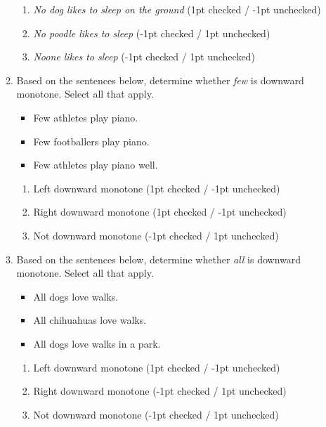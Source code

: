 \documentclass[a4,11pt]{article}
\begin{document}
\begin{enumerate}[leftmargin = 12pt]
\begin{enumerate}
      \begin{enumerate}[noitemsep]
        \item \textit{No dog likes to sleep on the ground} (1pt checked / -1pt unchecked)
	\item \textit{No poodle likes to sleep} (-1pt checked / 1pt unchecked)
        \item \textit{Noone likes to sleep} (-1pt checked / 1pt unchecked)
	\end{enumerate}	

\item  Based on the sentences below, determine whether \textit{few} is downward monotone. Select all that apply. 

\begin{itemize}[noitemsep]
\item Few athletes play piano.
\item Few footballers play piano.
\item Few athletes play piano well.
\end{itemize}

      \begin{enumerate}[noitemsep]
        \item Left downward monotone (1pt checked / -1pt unchecked)
        \item Right downward monotone (1pt checked / -1pt unchecked)
        \item Not downward monotone (-1pt checked / 1pt unchecked)
	\end{enumerate}	

\item Based on the sentences below, determine whether \textit{all} is downward monotone. Select all that apply. 
\begin{itemize}[noitemsep]
\item All dogs love walks.
\item All chihuahuas love walks.
\item All dogs love walks in a park.
\end{itemize}


      \begin{enumerate}[noitemsep]
        \item Left downward monotone (1pt checked / -1pt unchecked)
        \item Right downward monotone (-1pt checked / 1pt unchecked)
        \item Not downward monotone (-1pt checked / 1pt unchecked)
	\end{enumerate}	


\end{enumerate}
\end{enumerate}
\end{document}
